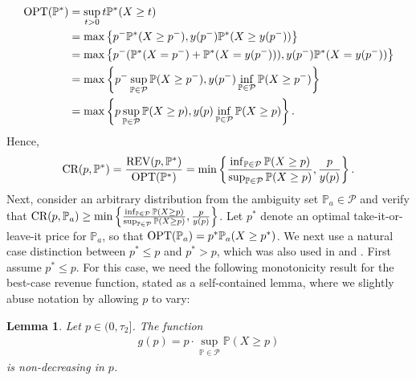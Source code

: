 \documentclass[11pt]{article}
\newtheorem{lemma}{Lemma}[section]
\newcommand{\Prob}{\mathbb{P}}
\newcommand{\bP}{\mathbb{P}}
\newcommand{\cP}{\mathcal{P}}
\newcommand{\1}{\mathds{1}}
\begin{document}
\begin{align*}
\textup{OPT}(\bP^*) &= \sup_{t>0} t \bP^*(X \geq t) \\ 
&= \max\left\{p^-\bP^*(X \geq p^-), y(p^-)\bP^*(X \geq y(p^-))\right\} \\
&= \max\left\{p^-(\bP^*(X = p^-) + \bP^*(X = y(p^-))), y(p^-)\bP^*(X = y(p^-))\right\} \\
&= \max\left\{p^-\sup_{\bP\in \cP}\bP(X\geq p^-), y(p^-)\inf_{\bP\in \cP}\bP(X\geq p^-)\right\} \\
&= \max\left\{p\sup_{\bP\in \cP}\bP(X\geq p), y(p)\inf_{\bP\in \cP}\bP(X\geq p)\right\}.
\end{align*}
Hence,
\begin{align*}
    \textup{CR}(p,\bP^*) =
    \frac{\textup{REV}(p,\bP^*)}{\textup{OPT}(\bP^*)} = \min\left\{\frac{\inf_{\bP\in \cP}\bP(X\geq p)}{\sup_{\bP\in \cP}\bP(X\geq p)}, \frac{p}{y(p)}\right\}.
\end{align*}
 {Next, consider an arbitrary distribution from the ambiguity set $\bP_a \in \cP$ and verify that} $\textup{CR}(p,\bP_a) \geq \min\left\{\frac{\inf_{\bP\in \cP}\bP(X\geq p)}{\sup_{\bP\in \cP}\bP(X\geq p)}, \frac{p}{y(p)}\right\}$. Let $p^*$ denote an optimal take-it-or-leave-it price for $\bP_a$, so that $\textup{OPT}(\bP_a) = p^* \bP_a(X\geq p^*)$. 
 We next use a natural case distinction between $p^*\leq p$ and $p^*> p$, which was also used in \cite{chen2022distribution} and \cite{giannakopoulos2019robust}.
 First assume $p^* \leq p$. For this case, we need the following monotonicity result for the best-case revenue function, stated as a self-contained lemma, where we slightly abuse notation by allowing $p$ to vary:
 \begin{lemma}\label{lemma:g(t)}
    Let $p \in (0,\tau_2]$. The function 
    \begin{align}\label{function_g}
        g(p) = p \cdot \sup_{\Prob \in \cP}  \Prob(X \geq p)
    \end{align}
    is non-decreasing in $p$.
\end{lemma}
\end{document}
